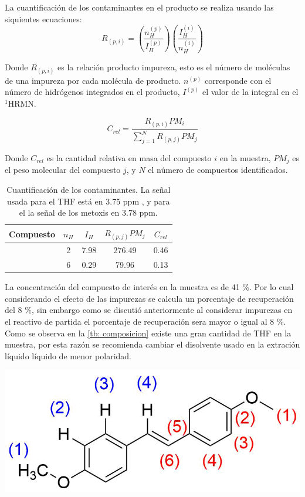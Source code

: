 \documentclass[fleqn,11pt]{SelfArx}
\begin{document}
La cuantificaci\'on de los contaminantes en el producto se realiza usando las siquientes ecuaciones:
\begin{equation}
	R_{(p, i)} = \left(\dfrac{n_H^{(p)}}{I_H^{(p)}}\right)\left(\dfrac{I_H^{(i)}}{n_H^{(i)}}\right)
\end{equation}

\pagebreak
Donde $R_{(p, i)}$ es la relaci\'on producto impureza, esto es el n\'umero de mol\'eculas de una impureza por cada mol\'ecula de producto. $n^{(p)}$ corresponde con el n\'umero de hidr\'ogenos integrados en el producto, $I^{(p)}$ el valor de la integral en el $^1$HRMN.

\begin{equation}
	C_{rel} = \dfrac{R_{(p, i)}PM_{i}}{\sum\limits_{j=1}^N R_{(p, j)}PM_{j}}
\end{equation}

Donde $C_{rel}$ es la cantidad relativa en masa del compuesto $i$ en la muestra, $PM_j$ es el peso molecular del compuesto $j$, y $N$ el n\'umero de compuestos identificados.
\begin{table}[h]
	\centering
	\caption{Cuantificaci\'on de los contaminantes. La señal usada para el THF est\'a en 3.75 ppm \cite{Fulmer2010}, y para el  la señal de los metoxis en 3.78 ppm.}
	\begin{tabular}{ccccc}
		\hline
		\textbf{Compuesto} & $n_H$ & $I_H$ & $R_{(p, j)}PM_j$ & $C_{rel}$ \\
		\hline
		\ce{THF} & 2 & 7.98 & 276.49 & 0.46 \\
		\ce{C16H18O4} & 6 & 0.29 & 79.96 & 0.13 \\
		\hline
	\end{tabular}
	\label{tb: composicion}
\end{table}

La concentraci\'on del compuesto de inter\'es en la muestra es de 41 \%. Por lo cual considerando el efecto de las impurezas se calcula un porcentaje de recuperaci\'on del 8 \%, sin embargo como se discuti\'o anteriormente al considerar impurezas en el reactivo de partida el porcentaje de recuperaci\'on sera mayor o igual al 8 \%. Como se observa en la \autoref{tb: composicion} existe una gran cantidad de THF en la muestra, por esta raz\'on se recomienda cambiar el disolvente usado en la extraci\'on l\'iquido l\'iquido de menor polaridad.
\begin{scheme}[h]
	\centering
	\includegraphics[width=0.7\linewidth]{structures/RMN.png}
	\caption{Asignaci\'on de señales de RMN, en azul se enumeran los protones y en rojo los carbonos.}
\end{scheme}
\end{document}
